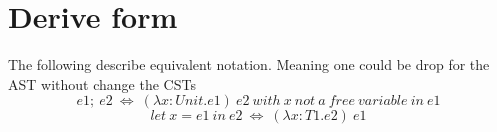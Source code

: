 \documentclass[10pt,a4paper]{article}
\begin{document}
\section*{ Derive form }
The following describe equivalent notation. Meaning one could be drop for the AST without change the CSTs
\begin{equation*}e1;\ e2\ \iff \ (\lambda x:Unit.e1)\ e2\ with\ x\ not\ a\ free\ variable\ in\ e1 \ \end{equation*}
\begin{equation*}let\ x=e1\ in\ e2\ \iff\ (\lambda x:T1.e2)\ e1 \ \end{equation*}
\end{document}
